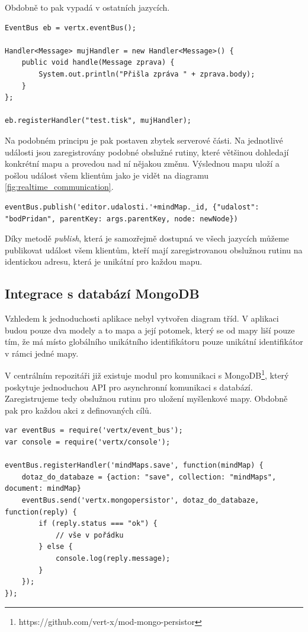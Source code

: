 Obdobně to pak vypadá v ostatních jazycích. 

\begin{lstlisting}[caption=Zaregistrování obslužné rutiny v jazyce Java]
EventBus eb = vertx.eventBus();

Handler<Message> mujHandler = new Handler<Message>() {
    public void handle(Message zprava) {
        System.out.println("Přišla zpráva " + zprava.body);
    }
};

eb.registerHandler("test.tisk", mujHandler);
\end{lstlisting}

Na podobném principu je pak postaven zbytek serverové části. Na jednotlivé události jsou zaregistrovány podobné obslužné rutiny, které většinou dohledají konkrétní mapu a provedou nad ní nějakou změnu. Výslednou mapu uloží a pošlou událost všem klientům jako je vidět na diagramu \ref{fig:realtime_communication}.

\begin{lstlisting}[caption=Publikování zprávy v jazyce JavaScript]
eventBus.publish('editor.udalosti.'+mindMap._id, {"udalost": "bodPridan", parentKey: args.parentKey, node: newNode})
\end{lstlisting}

Díky metodě \emph{publish}, která je samozřejmě dostupná ve všech jazycích můžeme publikovat událost všem klientům, kteří mají zaregistrovanou obslužnou rutinu na identickou adresu, která je unikátní pro každou mapu.

\subsection{Integrace s databází MongoDB}

Vzhledem k jednoduchosti aplikace nebyl vytvořen diagram tříd. V aplikaci budou pouze dva modely a to mapa a její potomek, který se od mapy liší pouze tím, že má místo globálního unikátního identifikátoru pouze unikátní identifikátor v rámci jedné mapy.

V centrálním repozitáři již existuje modul pro komunikaci s MongoDB\footnote{https://github.com/vert-x/mod-mongo-persistor}, který poskytuje jednoduchou API pro asynchronní komunikaci s databází. Zaregistrujeme tedy obslužnou rutinu pro uložení myšlenkové mapy. Obdobně pak pro každou akci z definovaných cílů.

\begin{lstlisting}[caption=Uložení myšlenkové mapy do databáze]
var eventBus = require('vertx/event_bus');
var console = require('vertx/console');

eventBus.registerHandler('mindMaps.save', function(mindMap) {
	dotaz_do_databaze = {action: "save", collection: "mindMaps", document: mindMap}
	eventBus.send('vertx.mongopersistor', dotaz_do_databaze, function(reply) {
		if (reply.status === "ok") {
			// vše v pořádku
		} else {
			console.log(reply.message);
		}
	});
});

\end{lstlisting}

